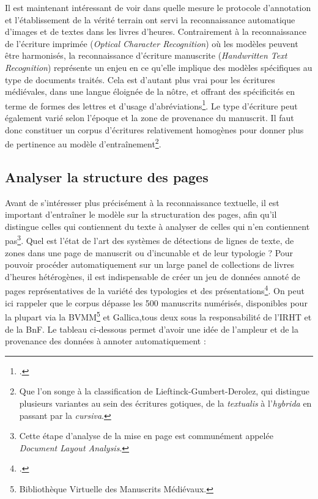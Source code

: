 \documentclass[a4paper,12pt,twoside]{book}
\begin{document}
Il est maintenant intéressant de voir dans quelle mesure le protocole d'annotation et l'établissement de la vérité terrain ont servi la reconnaissance automatique d'images et de textes dans les livres d'heures. Contrairement à la reconnaissance de l'écriture imprimée (\textit{Optical Character Recognition}) où les modèles peuvent être harmonisés, la reconnaissance d'écriture manuscrite (\textit{Handwritten Text Recognition}) représente un enjeu en ce qu'elle implique des modèles spécifiques au type de documents traités. Cela est d'autant plus vrai pour les écritures médiévales, dans une langue éloignée de la nôtre, et offrant des spécificités en terme de formes des lettres et d'usage d'abréviations\footcite[p. 21]{Seg_Livres_Heures}. Le type d'écriture peut également varié selon l'époque et la zone de provenance du manuscrit. Il faut donc constituer un corpus d'écritures relativement homogènes pour donner plus de pertinence au modèle d'entraînement\footnote{Que l'on songe à la classification de Lieftinck-Gumbert-Derolez, qui distingue plusieurs variantes au sein des écritures gotiques, de la \textit{textualis} à l'\textit{hybrida} en passant par la \textit{cursiva}\cite{classification_ecriture_gothique}.}.


	\subsection{Analyser la structure des pages}
	
	Avant de s'intéresser plus précisément à la reconnaissance textuelle, il est important d'entraîner le modèle sur la structuration des pages, afin qu'il distingue celles qui contiennent du texte à analyser de celles qui n'en contiennent pas\footnote{Cette étape d'analyse de la mise en page est communément appelée \textit{Document Layout Analysis}.}. Quel est l'état de l'art des systèmes de détections de lignes de texte, de zones dans une page de manuscrit ou d'incunable et de leur typologie ? Pour pouvoir procéder automatiquement sur un large panel de collections de livres d'heures hétérogènes, il est indispensable de créer un jeu de données annoté de pages représentatives de la variété des typologies et des présentations\footcite[p. 7]{annotated_dataset_book_hours}. On peut ici rappeler que le corpus dépasse les 500 manuscrits numérisés, disponibles pour la plupart via la BVMM\footnote{Bibliothèque Virtuelle des Manuscrits Médiévaux.} et Gallica,tous deux sous la responsabilité de l'IRHT et de la BnF. Le tableau ci-dessous permet d'avoir une idée de l'ampleur et de la provenance des données à annoter automatiquement : 
\end{document}
